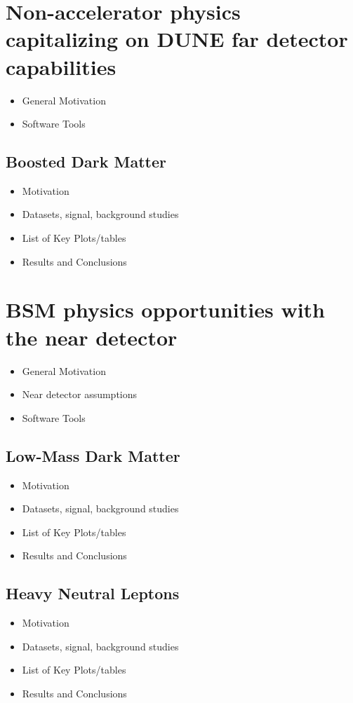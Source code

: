 \section{Non-accelerator physics capitalizing on DUNE far detector capabilities}\label{sec:bsm-nonaccel}
\begin{itemize}
\item General Motivation
\item Software Tools
\end{itemize}

\subsection{Boosted Dark Matter}
\begin{itemize}
\item Motivation
\item Datasets, signal, background studies
\item List of Key Plots/tables
\item Results and Conclusions
\end{itemize}

\section{BSM physics opportunities with the near detector}\label{sec:bsm-nd}
\begin{itemize}
\item General Motivation
\item Near detector assumptions
\item Software Tools
\end{itemize}

\subsection{Low-Mass Dark Matter}
\begin{itemize}
\item Motivation
\item Datasets, signal, background studies
\item List of Key Plots/tables
\item Results and Conclusions
\end{itemize}

\subsection{Heavy Neutral Leptons}
\begin{itemize}
\item Motivation
\item Datasets, signal, background studies
\item List of Key Plots/tables
\item Results and Conclusions
\end{itemize}

